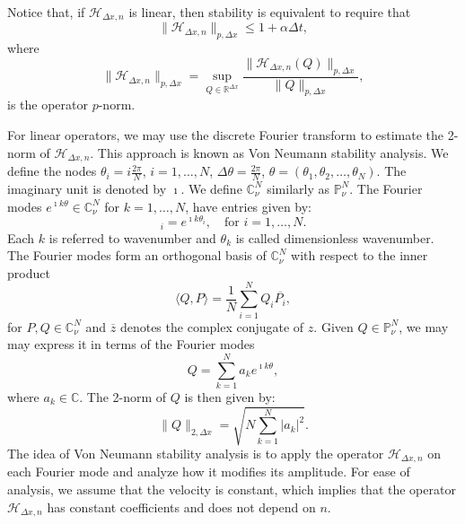Notice that, if $\mathcal{H}_{\Delta x,n}$ is linear, then stability is equivalent to require that
\begin{equation*}
	\|\mathcal{H}_{\Delta x,n}\|_{p,\Delta x} \leq 1+ \alpha \Delta t,
\end{equation*}
where
\begin{equation*}
	\|\mathcal{H}_{\Delta x,n}\|_{p,\Delta x} = \sup_{Q\in \mathbb{R}^{\Delta x}} \frac{\|\mathcal{H}_{\Delta x,n}(Q)\|_{p,\Delta x}}{\|Q\|_{p,\Delta x}},
\end{equation*}
is the operator $p$-norm.

For linear operators, we may use the discrete Fourier transform \citep{trefethen:2000}
to estimate the 2-norm of $\mathcal{H}_{\Delta x,n}$. This approach is known as Von Neumann stability analysis.
We define the nodes $\theta_i = i\frac{2\pi}{N}$, $i=1, \ldots, N$, $\Delta \theta = \frac{2\pi}{N}$,
$\theta = (\theta_1, \theta_2, \ldots, \theta_N)$.
The imaginary unit is denoted by $\imath$.
We define $\mathbb{C}^{N}_{\nu}$  similarly as $\mathbb{P}^{N}_{\nu}$.
The Fourier modes $e^{\imath k \theta} \in \mathbb{C}^{N}_{\nu}$ for $k=1, \ldots, N$, have entries given by:
\begin{equation*}
	[e^{\imath k \theta}]_i = e^{\imath k\theta_i},\quad \text{for } i=1, \ldots, N.
\end{equation*}
Each $k$ is referred to wavenumber and $\theta_k$ is called  dimensionless wavenumber.
The Fourier modes form an orthogonal basis of $\mathbb{C}^N_{\nu}$ with respect to the 
inner product
\begin{equation*}
	\langle Q, P \rangle = \frac{1}{N}\sum_{i=1}^{N}{Q_i \overline{P_i}},
\end{equation*}
for $P, Q \in \mathbb{C}^{N}_{\nu}$ and $\overline{z}$ denotes the complex conjugate of $z$. 
Given $Q \in \mathbb{P}^{N}_{\nu}$, we may may express it in terms of the Fourier modes
\begin{equation*}
	Q = \sum_{k=1}^{N} a_k e^{\imath k \theta},
\end{equation*}
where $a_k \in \mathbb{C}$. The 2-norm of $Q$ is then given by:
\begin{equation*}
	\|Q\|_{2,\Delta x} = \sqrt{N \sum_{k=1}^{N} |a_k|^2}.
\end{equation*}
The idea of Von Neumann stability analysis is to apply the operator $\mathcal{H}_{\Delta x,n}$ on each Fourier mode and
analyze how it modifies its amplitude.
For ease of analysis, we assume that the velocity is constant, which implies that
the operator $\mathcal{H}_{\Delta x,n}$ has constant coefficients and does not depend on $n$.
